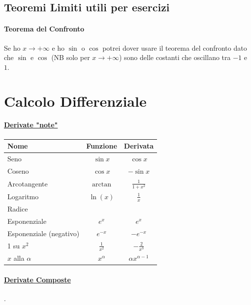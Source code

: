 \documentclass[12pt, a4paper]{article}
\begin{document}
	\subsection*{Teoremi Limiti utili per esercizi}
	\paragraph*{Teorema del Confronto} Se ho $x \rightarrow +\infty$ e ho $\sin$ o  $\cos$ potrei dover usare
	il teorema del confronto dato che $\sin$ e $\cos$ (NB solo per $x \rightarrow +\infty$)
	sono delle costanti che oscillano tra $-1$ e $1$.


	\section*{Calcolo Differenziale}

	\paragraph*{\underline{Derivate "note"}}
	\begin{tabularx}{0.775\textwidth}{|Y|c|c|}
		\hline
		\textbf{Nome}           & \textbf{Funzione} & \textbf{Derivata}     \\
		\hline
		\hline
		Seno                    & $\sin x$          & $\cos x$              \\
		\hline
		Coseno                  & $\cos x$          & $-\sin x$             \\
		\hline
		Arcotangente            & $\arctan$         & $\frac{1}{1+x^2}$     \\
		\hline
		Logaritmo               & $\ln(x) $         & $\frac{1}{x}$         \\
		\hline
		Radice                  &                   &                       \\
		\hline
		Esponenziale            & $e^x$             & $e^x$                 \\
		\hline
		Esponenziale (negativo) & $e^{-x}$          & $ -e^{-x}$            \\
		 su $x^2$              & $\frac{1}{x^2}$   & $-\frac{2}{x^3}$      \\
		\hline
		$x$ alla $\alpha$       & $x^\alpha$        & $\alpha x^{\alpha-1}$ \\
		\hline
	\end{tabularx}

	\paragraph*{\underline{Derivate Composte}}.\\
\end{document}

